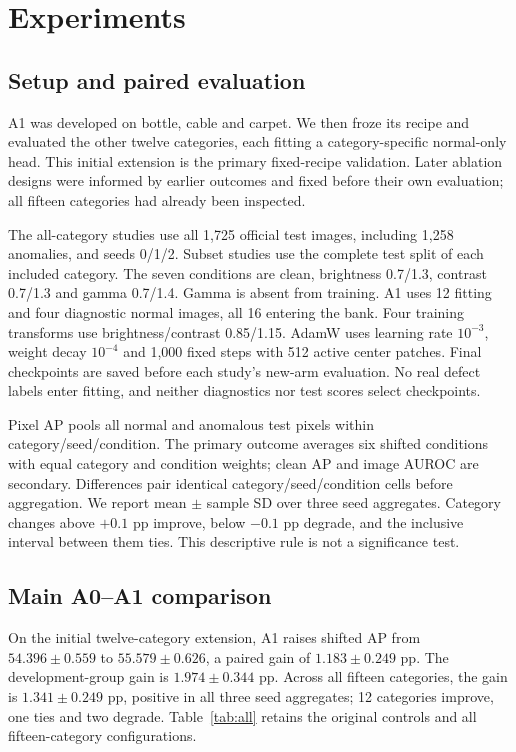 \section{Experiments}
\label{sec:experiments}
\subsection{Setup and paired evaluation}
A1 was developed on bottle, cable and carpet. We then froze its recipe and evaluated the other twelve categories, each fitting a category-specific normal-only head. This initial extension is the primary fixed-recipe validation. Later ablation designs were informed by earlier outcomes and fixed before their own evaluation; all fifteen categories had already been inspected.

The all-category studies use all 1,725 official test images, including 1,258 anomalies, and seeds 0/1/2. Subset studies use the complete test split of each included category. The seven conditions are clean, brightness 0.7/1.3, contrast 0.7/1.3 and gamma 0.7/1.4. Gamma is absent from training. A1 uses 12 fitting and four diagnostic normal images, all 16 entering the bank. Four training transforms use brightness/contrast 0.85/1.15. AdamW uses learning rate $10^{-3}$, weight decay $10^{-4}$ and 1,000 fixed steps with 512 active center patches. Final checkpoints are saved before each study's new-arm evaluation. No real defect labels enter fitting, and neither diagnostics nor test scores select checkpoints.

Pixel AP pools all normal and anomalous test pixels within category/seed/condition. The primary outcome averages six shifted conditions with equal category and condition weights; clean AP and image AUROC are secondary. Differences pair identical category/seed/condition cells before aggregation. We report mean $\pm$ sample SD over three seed aggregates. Category changes above $+0.1$ pp improve, below $-0.1$ pp degrade, and the inclusive interval between them ties. This descriptive rule is not a significance test.

\subsection{Main A0--A1 comparison}
On the initial twelve-category extension, A1 raises shifted AP from $54.396\pm0.559$ to $55.579\pm0.626$, a paired gain of $1.183\pm0.249$ pp. The development-group gain is $1.974\pm0.344$ pp. Across all fifteen categories, the gain is $1.341\pm0.249$ pp, positive in all three seed aggregates; 12 categories improve, one ties and two degrade. Table~\ref{tab:all} retains the original controls and all fifteen-category configurations.

